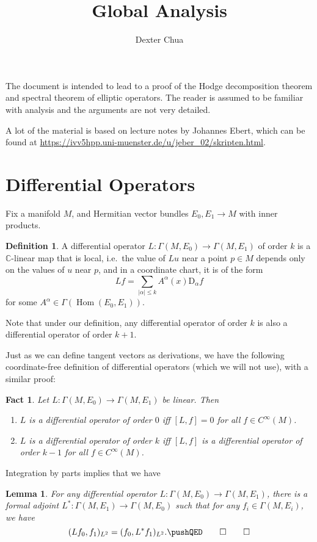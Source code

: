 \documentclass{shortart}
\title{Global Analysis}
\author{Dexter Chua}
\newtheorem*{lemma}{Lemma}
\newtheorem*{fact}{Fact}
\theoremstyle{definition}
\newtheorem*{defi}{Definition}
\newcommand\C{\mathbb{C}}
\newcommand\D{\mathrm{D}}
\DeclareMathOperator\Hom{Hom}
\begin{document}
The document is intended to lead to a proof of the Hodge decomposition theorem and spectral theorem of elliptic operators. The reader is assumed to be familiar with analysis and the arguments are not very detailed.

A lot of the material is based on lecture notes by Johannes Ebert, which can be found at \url{https://ivv5hpp.uni-muenster.de/u/jeber_02/skripten.html}.

\section{Differential Operators}
Fix a manifold $M$, and Hermitian vector bundles $E_0, E_1 \to M$ with inner products.

\begin{defi}
  A differential operator $L: \Gamma(M, E_0) \to \Gamma(M, E_1)$ of order $k$ is a $\C$-linear map that is local, i.e.\ the value of $Lu$ near a point $p \in M$ depends only on the values of $u$ near $p$, and in a coordinate chart, it is of the form
  \[
    Lf = \sum_{|\alpha| \leq k} A^\alpha(x) \D_\alpha f
  \]
  for some $A^\alpha \in \Gamma(\Hom(E_0, E_1))$.
\end{defi}
Note that under our definition, any differential operator of order $k$ is also a differential operator of order $k + 1$.

Just as we can define tangent vectors as derivations, we have the following coordinate-free definition of differential operators (which we will not use), with a similar proof:
\begin{fact}
  Let $L: \Gamma(M, E_0) \to \Gamma(M, E_1)$ be linear. Then
  \begin{enumerate}
    \item $L$ is a differential operator of order $0$ iff $[L, f] = 0$ for all $f \in C^\infty(M)$.
    \item $L$ is a differential operator of order $k$ iff $[L, f]$ is a differential operator of order $k - 1$ for all $f \in C^\infty(M)$.\fakeqed
  \end{enumerate}
\end{fact}

Integration by parts implies that we have
\begin{lemma}
  For any differential operator $L: \Gamma(M, E_0) \to \Gamma(M, E_1)$, there is a \emph{formal adjoint} $L^*: \Gamma(M, E_1) \to \Gamma(M, E_0)$ such that for any $f_i \in \Gamma(M, E_i)$, we have
  \[
    (Lf_0, f_1)_{L^2} = (f_0, L^* f_1)_{L^2}.\fakeqed
  \]\ifplastex\fakeqed\fi
\end{lemma}
\end{document}
